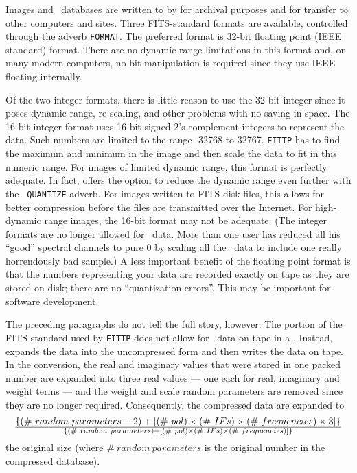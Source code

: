      Images and \uv\ databases are written to  by
{\tt {}} for archival purposes and for transfer to other
computers and sites.  Three FITS-standard formats are available,
controlled through the adverb {\tt FORMAT}.  The preferred format is
32-bit floating point (IEEE standard) format.  There are no dynamic
range limitations in this format and, on many modern computers, no bit
manipulation is required since they use IEEE floating internally.

     Of the two integer formats, there is little reason to use the
32-bit integer since it poses dynamic range, re-scaling, and other
problems with no saving in space.  The 16-bit integer format uses
16-bit signed 2's complement integers to represent the data.  Such
numbers are limited to the range -32768 to 32767.  {\tt FITTP} has to
find the maximum and minimum in the image and then scale the data to
fit in this numeric range.  For images of limited dynamic range, this
format is perfectly adequate.  In fact, {\tt {}} offers the
option to reduce the dynamic range even further with the {\tt
QUANTIZE} adverb.  For images written to FITS disk files, this allows
for better compression before the files are transmitted over the
Internet.  For high-dynamic range images, the 16-bit format may not be
adequate. (The integer formats are no longer allowed for \uv\ data.
More than one user has reduced all his ``good'' spectral channels to
pure 0 by scaling all the \uv\ data to include one really horrendously
bad sample.)  A less important benefit of the floating point format is
that the numbers representing your data are recorded exactly on tape
as they are stored on disk; there are no ``quantization errors''.
This may be important for software development.

     The preceding paragraphs do not tell the full story, however.
The portion of the FITS standard used by {\tt FITTP} does not allow
for \uv\ data on tape in a . Instead, {\tt
{}} expands the data into the uncompressed form and then
writes the data on tape.  In the conversion, the real and imaginary
values that were stored in one packed number are expanded into three
real values --- one each for real, imaginary and weight terms --- and
the weight and scale random parameters are removed since they are no
longer required.  Consequently, the compressed data are expanded to
$$
    \lbrace (\#~random~parameters - 2 ) + \lbrack (\#~pol) \times
        (\#~IFs) \times (\#~frequencies) \times 3 \rbrack \rbrace
      \over
     \lbrace (\#~random~parameters) + \lbrack (\#~pol) \times (\#~IFs)
       \times (\#~frequencies) \rbrack \rbrace
$$
the original size  (where $\#~random~parameters$ is the original
number in the compressed database).

